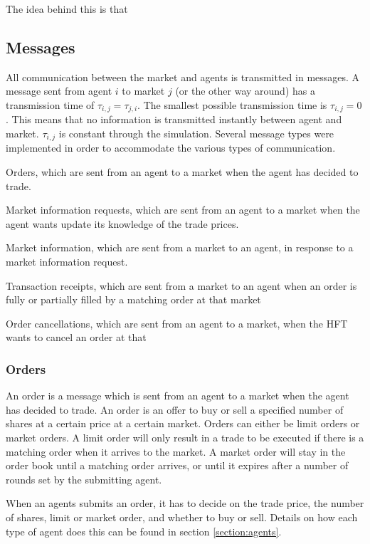 The idea behind this is that 


\subsection{Messages}
All communication between the market and agents is transmitted in messages. A message sent from agent $i$ to market $j$ (or the other way around) has a transmission time of $\tau_{i,j} = \tau_{j,i}$. The smallest possible transmission time is $\tau_{i,j} = 0$. This means that no information is transmitted instantly between agent and market. $\tau_{i,j}$ is constant through the simulation. Several message types were implemented in order to accommodate the various types of communication.


\item Orders, which are sent from an agent to a market when the agent has decided to trade.
\item Market information requests, which are sent from an agent to a market when the agent wants update its knowledge of the trade prices.
\item Market information, which are sent from a market to an agent, in response to a market information request.
\item Transaction receipts, which are sent from a market to an agent when an order is fully or partially filled by a matching order at that market
\item Order cancellations, which are sent from an agent to a market, when the HFT wants to cancel an order at that 

\subsubsection{Orders}
An order is a message which is sent from an agent to a market when the agent has decided to trade. An order is an offer to buy or sell a specified number of shares at a certain price at a certain market. Orders can either be limit orders or market orders. A limit order will only result in a trade to be executed if there is a matching order when it arrives to the market. A market order will stay in the order book until a matching order arrives, or until it expires after a number of rounds set by the submitting agent. 

When an agents submits an order, it has to decide on the trade price, the number of shares, limit or market order, and whether to buy or sell. Details on how each type of agent does this can be found in section \ref{section:agents}.

